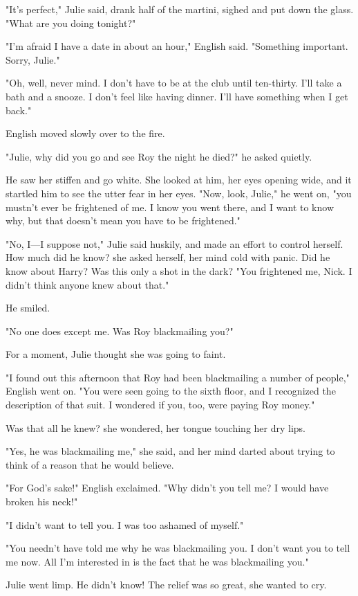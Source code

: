 \documentclass{novel}
\begin{document}
"It's perfect," Julie said, drank half of the martini, sighed and put down the glass. "What are you doing tonight?"

"I'm afraid I have a date in about an hour," English said. "Something important. Sorry, Julie."

"Oh, well, never mind. I don't have to be at the club until ten-thirty. I'll take a bath and a snooze. I don't feel like having dinner. I'll have something when I get back."

English moved slowly over to the fire.

"Julie, why did you go and see Roy the night he died?" he asked quietly.

He saw her stiffen and go white. She looked at him, her eyes opening wide, and it startled him to see the utter fear in her eyes. "Now, look, Julie," he went on, "you mustn't ever be frightened of me. I know you went there, and I want to know why, but that doesn't mean you have to be frightened."

"No, I—I suppose not," Julie said huskily, and made an effort to control herself. How much did he know? she asked herself, her mind cold with panic. Did he know about Harry? Was this only a shot in the dark? "You frightened me, Nick. I didn't think anyone knew about that."

He smiled.

"No one does except me. Was Roy blackmailing you?"

For a moment, Julie thought she was going to faint.

"I found out this afternoon that Roy had been blackmailing a number of people," English went on. "You were seen going to the sixth floor, and I recognized the description of that suit. I wondered if you, too, were paying Roy money."

Was that all he knew? she wondered, her tongue touching her dry lips.

"Yes, he was blackmailing me," she said, and her mind darted about trying to think of a reason that he would believe.

"For God's sake!" English exclaimed. "Why didn't you tell me? I would have broken his neck!"

"I didn't want to tell you. I was too ashamed of myself."

"You needn't have told me why he was blackmailing you. I don't want you to tell me now. All I'm interested in is the fact that he was blackmailing you."

Julie went limp. He didn't know! The relief was so great, she wanted to cry.
\end{document}
